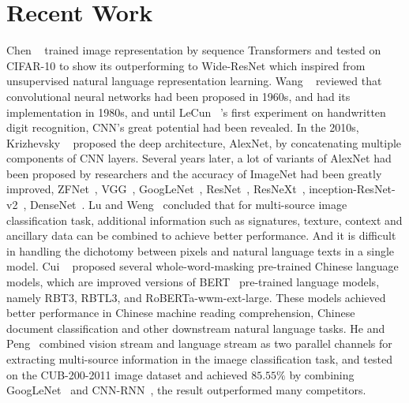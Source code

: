 \documentclass[review]{cvpr}
\begin{document}

\section{Recent Work}

  Chen \etal~\cite{chen2020generative} trained image representation by sequence Transformers and tested on CIFAR-10 to show its outperforming to Wide-ResNet
which inspired from unsupervised natural language representation learning.
  Wang \etal~\cite{wang2019development} reviewed that convolutional neural networks had been proposed in 1960s, and had its implementation in 1980s,
and until LeCun \etal~\cite{lecun1990handwritten}'s first experiment on handwritten digit recognition, CNN's great potential had been revealed.
  In the 2010s, Krizhevsky \etal~\cite{krizhevsky2012imagenet} proposed the deep architecture, AlexNet, by concatenating multiple components of CNN layers.
Several years later, a lot of variants of AlexNet had been proposed by researchers and the accuracy of ImageNet had been greatly improved, \eg ZFNet~\cite{zeiler2014visualizing}, VGG~\cite{simonyan2014very}, GoogLeNet~\cite{szegedy2015going}, ResNet~\cite{he2016deep},
 ResNeXt~\cite{xie2017aggregated}, inception-ResNet-v2~\cite{szegedy2016inception}, DenseNet~\cite{huang2016deep}.
  Lu and Weng~\cite{lu2007survey} concluded that for multi-source image classification task, additional information such as signatures, texture, context and ancillary data can be combined to achieve better performance.
And it is difficult in handling the dichotomy between pixels and natural language texts in a single model.
  Cui \etal~\cite{cui2020revisiting} proposed several whole-word-masking pre-trained Chinese language models,
which are improved versions of BERT~\cite{devlin2019bert} pre-trained language models, namely RBT3, RBTL3, and RoBERTa-wwm-ext-large.
These models achieved better performance in Chinese machine reading comprehension, Chinese document classification and other downstream natural language tasks.
  He and Peng~\cite{he2017fine} combined vision stream and language stream as two parallel channels for extracting multi-source information in the imaege classification task,
and tested on the CUB-200-2011 image dataset and achieved $85.55\%$ by combining GoogLeNet~\cite{szegedy2015going} and CNN-RNN~\cite{reed2016learning}, the result outperformed many competitors.

\end{document}
